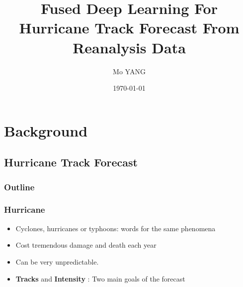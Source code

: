 \documentclass{beamer}
\title[DL for hurricane track forecast ] %
{Fused Deep Learning For Hurricane Track Forecast From Reanalysis Data}
\author{Mo YANG}
\institute[u-psud] %
{
	Supervisor: \\ %
	\medskip
	Claire Monteleoni
	\\
	Guillaume Charpiat 
	\\
	Sophie Giffard-Roisin
}
\date{\today} %
\begin{document}
\begin{frame}
\titlepage %
\end{frame}



\section{Background} %
\subsection{Hurricane Track Forecast}

\begin{frame}
\frametitle{Outline} %
\tableofcontents[currentsection] %
\end{frame}


\begin{frame}
\frametitle{Hurricane}
\begin{itemize}
\item Cyclones, hurricanes or typhoons: words for the same phenomena
\item Cost tremendous damage and death each year
\item Can be very unpredictable.
\item \textbf{Tracks} and \textbf{Intensity} : Two main goals of the forecast
\end{itemize}
\end{frame}
\end{document}
